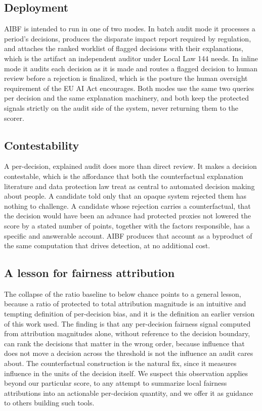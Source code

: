 \documentclass[conference]{IEEEtran}
\begin{document}
\subsection{Deployment}
AIBF is intended to run in one of two modes. In batch audit mode it processes a
period's decisions, produces the disparate impact report required by regulation, and
attaches the ranked worklist of flagged decisions with their explanations, which is
the artifact an independent auditor under Local Law 144 needs. In inline mode
it audits each decision as it is made and routes a flagged decision to human review
before a rejection is finalized, which is the posture the human oversight requirement
of the EU AI Act encourages. Both modes use the same two queries per decision and the
same explanation machinery, and both keep the protected signals strictly on the audit
side of the system, never returning them to the scorer.

\subsection{Contestability}
A per-decision, explained audit does more than direct review. It makes a decision
contestable, which is the affordance that both the counterfactual explanation
literature \cite{wachter} and data protection law \cite{gdpr} treat as central to
automated decision making about people. A candidate told only that an opaque system
rejected them has nothing to challenge. A candidate whose rejection carries a
counterfactual, that the decision would have been an advance had protected proxies not
lowered the score by a stated number of points, together with the factors responsible,
has a specific and answerable account. AIBF produces that account as a byproduct of the
same computation that drives detection, at no additional cost.

\subsection{A lesson for fairness attribution}
The collapse of the ratio baseline to below chance points to a general
lesson, because a ratio of protected to total attribution magnitude is an intuitive and
tempting definition of per-decision bias, and it is the definition an earlier version of
this work used. The finding is that any per-decision fairness signal computed from
attribution magnitudes alone, without reference to the decision boundary, can rank the
decisions that matter in the wrong order, because influence that does not move a
decision across the threshold is not the influence an audit cares about. The
counterfactual construction is the natural fix, since it measures influence in the units
of the decision itself. We suspect this observation applies beyond our particular score,
to any attempt to summarize local fairness attributions into an actionable per-decision
quantity, and we offer it as guidance to others building such tools.
\end{document}
